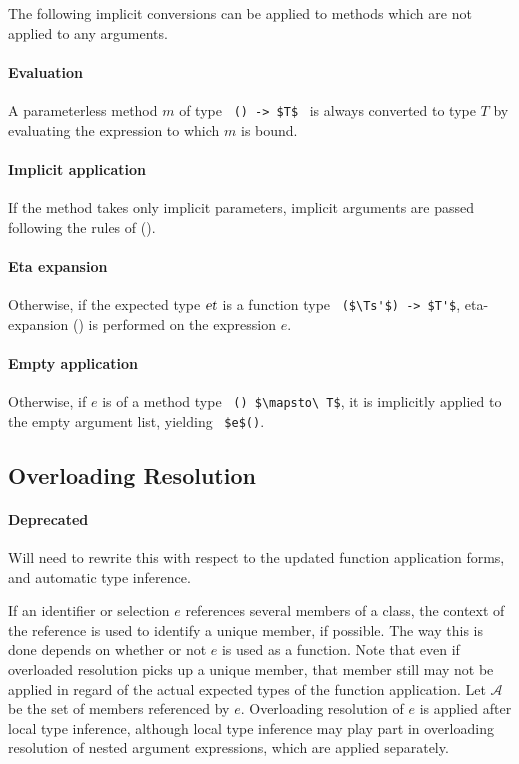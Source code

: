 The following implicit conversions can be applied to methods which are not applied to any arguments. 

\paragraph{Evaluation}
A parameterless method $m$ of type ~\lstinline!() -> $T$!~ is always converted to type $T$ by evaluating the expression to which $m$ is bound. 

\paragraph{Implicit application}
If the method takes only implicit parameters, implicit arguments are passed following the rules of ().

\paragraph{Eta expansion}
Otherwise, if the expected type $\mbox{\sl et}$ is a function type ~\lstinline!($\Ts'$) -> $T'$!, eta-expansion () is performed on the expression $e$. 

\paragraph{Empty application}
Otherwise, if $e$ is of a method type ~\lstinline!() $\mapsto\ T$!, it is implicitly applied to the empty argument list, yielding ~\lstinline!$e$()!. 






\subsection{Overloading Resolution}
\label{sec:overloading-resolution}

\paragraph{Deprecated}
Will need to rewrite this with respect to the updated function application forms, and automatic type inference. 

If an identifier or selection $e$ references several members of a class, the context of the reference is used to identify a unique member, if possible. The way this is done depends on whether or not $e$ is used as a function. Note that even if overloaded resolution picks up a unique member, that member still may not be applied in regard of the actual expected types of the function application. Let $\mathcal{A}$ be the set of members referenced by $e$. Overloading resolution of $e$ is applied after local type inference, although local type inference may play part in overloading resolution of nested argument expressions, which are applied separately. 

